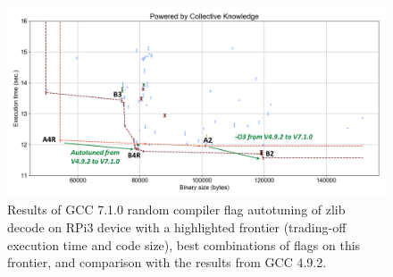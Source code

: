    \begin{figure}[!htbp]
     \centering
      \includegraphics[width=5.2in]
      {ck-assets/3f15a01f17d48b7b-cropped.pdf} %
      \vspace{0.1in}
      \vspace{0.1in}
     \caption{
       Results of GCC 7.1.0 random compiler flag autotuning of zlib decode on RPi3 device 
       with a highlighted frontier (trading-off execution time and code size), 
       best combinations of flags on this frontier, and comparison with the results from GCC 4.9.2.
     }
     \label{fig:autotuning-zlib-decode-gcc7}
   \end{figure}

